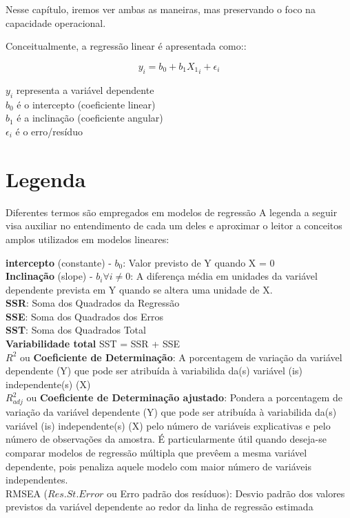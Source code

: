 \documentclass[
]{book}
\begin{document}
Nesse capítulo, iremos ver ambas as maneiras, mas preservando o foco na capacidade operacional.

Conceitualmente, a regressão linear é apresentada como::

\[y_i = b_0 + b_1X{_1}_i + \epsilon_{i}\]

\(y_i\) representa a variável dependente\\
\(b_0\) é o intercepto (coeficiente linear)\\
\(b_1\) é a inclinação (coeficiente angular)\\
\(\epsilon_{i}\) é o erro/resíduo

\hypertarget{legenda-1}{%
\section{Legenda}\label{legenda-1}}

Diferentes termos são empregados em modelos de regressão A legenda a seguir visa auxiliar no entendimento de cada um deles e aproximar o leitor a conceitos amplos utilizados em modelos lineares:

\begin{writing}
\textbf{intercepto} (constante) - \(b_0\): Valor previsto de Y quando X
= 0\\
\textbf{Inclinação} (slope) - \(b_i \forall i \neq 0\): A diferença
média em unidades da variável dependente prevista em Y quando se altera
uma unidade de X.\\
\textbf{SSR}: Soma dos Quadrados da Regressão\\
\textbf{SSE}: Soma dos Quadrados dos Erros\\
\textbf{SST}: Soma dos Quadrados Total\\
\textbf{Variabilidade total} SST = SSR + SSE\\
\(R^2\) ou \textbf{Coeficiente de Determinação}: A porcentagem de
variação da variável dependente (Y) que pode ser atribuída à variabilida
da(s) variável (is) independente(s) (X)\\
\(R^2_{adj}\) ou \textbf{Coeficiente de Determinação ajustado}: Pondera
a porcentagem de variação da variável dependente (Y) que pode ser
atribuída à variabilida da(s) variável (is) independente(s) (X) pelo
número de variáveis explicativas e pelo número de observações da
amostra. É particularmente útil quando deseja-se comparar modelos de
regressão múltipla que prevêem a mesma variável dependente, pois
penaliza aquele modelo com maior número de variáveis independentes.\\
RMSEA (\(Res. St. Error\) ou Erro padrão dos resíduos): Desvio padrão
dos valores previstos da variável dependente ao redor da linha de
regressão estimada
\end{writing}
\end{document}
